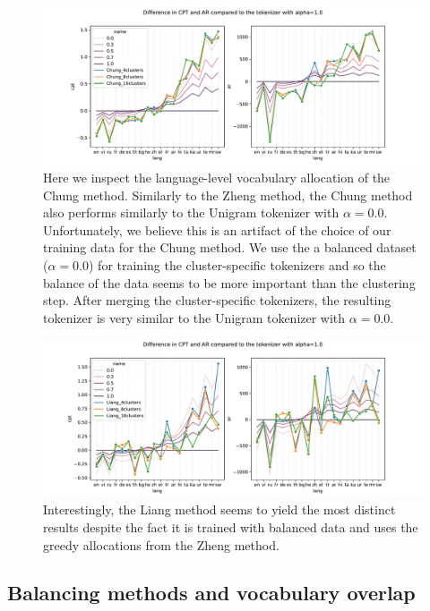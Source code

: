 \begin{figure}[H]
    \centering
    \includegraphics[width=\textwidth]{figures/chung_vs_alphas.pdf}
    \caption{Here we inspect the language-level vocabulary allocation of the Chung method. Similarly to the Zheng method, the Chung method also performs similarly to the Unigram tokenizer with $\alpha=0.0$. Unfortunately, we believe this is an artifact of the choice of our training data for the Chung method. We use the a balanced dataset ($\alpha=0.0$) for training the cluster-specific tokenizers and so the balance of the data seems to be more important than the clustering step. After merging the cluster-specific tokenizers, the resulting tokenizer is very similar to the Unigram tokenizer with $\alpha=0.0$.}
    \label{fig:chung_vs_alphas}
\end{figure}

\begin{figure}[H]
    \centering
    \includegraphics[width=\textwidth]{figures/liang_vs_alphas.pdf}
    \caption{Interestingly, the Liang method seems to yield the most distinct results despite the fact it is trained with balanced data and uses the greedy allocations from the Zheng method. }
    \label{fig:liang_vs_alphas}
\end{figure}

\subsection{Balancing methods and vocabulary overlap}
